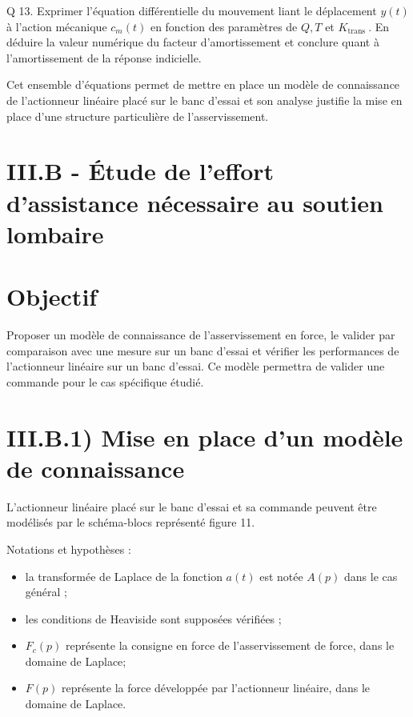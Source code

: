 \documentclass[10pt]{article}
\begin{document}
Q 13. Exprimer l'équation différentielle du mouvement liant le déplacement $y(t)$ à l'action mécanique $c_{m}(t)$ en fonction des paramètres de $Q, T$ et $K_{\text {trans }}$. En déduire la valeur numérique du facteur d'amortissement et conclure quant à l'amortissement de la réponse indicielle.

Cet ensemble d'équations permet de mettre en place un modèle de connaissance de l'actionneur linéaire placé sur le banc d'essai et son analyse justifie la mise en place d'une structure particulière de l'asservissement.

\section*{III.B - Étude de l'effort d'assistance nécessaire au soutien lombaire}
\section*{Objectif}
Proposer un modèle de connaissance de l'asservissement en force, le valider par comparaison avec une mesure sur un banc d'essai et vérifier les performances de l'actionneur linéaire sur un banc d'essai. Ce modèle permettra de valider une commande pour le cas spécifique étudié.

\section*{III.B.1) Mise en place d'un modèle de connaissance}
L'actionneur linéaire placé sur le banc d'essai et sa commande peuvent être modélisés par le schéma-blocs représenté figure 11.

Notations et hypothèses :

\begin{itemize}
  \item la transformée de Laplace de la fonction $a(t)$ est notée $A(p)$ dans le cas général ;

  \item les conditions de Heaviside sont supposées vérifiées ;

  \item $F_{c}(p)$ représente la consigne en force de l'asservissement de force, dans le domaine de Laplace;

  \item $F(p)$ représente la force développée par l'actionneur linéaire, dans le domaine de Laplace.

\end{itemize}
\end{document}
